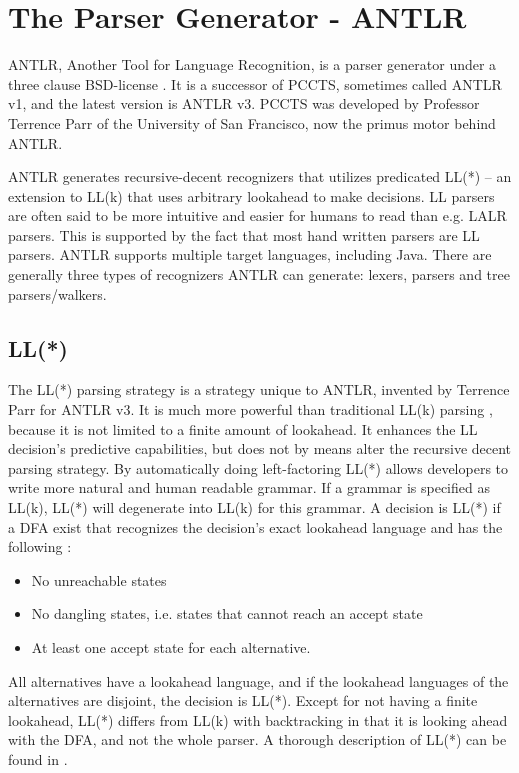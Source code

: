 \chapter{The Parser Generator - ANTLR}
\label{sect:antlr}
ANTLR, Another Tool for Language Recognition, is a parser generator under a
three clause BSD-license \cite{antlrorg}.  It is a successor of PCCTS,
sometimes called ANTLR v1, and the latest version is ANTLR v3. PCCTS was
developed by Professor Terrence Parr of the University of San Francisco, now
the primus motor behind ANTLR.

ANTLR generates recursive-decent recognizers that utilizes predicated LL(*) --
an extension to LL(k) that uses arbitrary lookahead to make decisions. LL
parsers are often said to be more intuitive and easier for humans to read than
e.g. LALR parsers. This is supported by the fact that most hand written parsers
are LL parsers. ANTLR supports multiple target languages, including Java. There
are generally three types of recognizers ANTLR can generate: lexers, parsers
and tree parsers/walkers.      

\section{LL(*)}
The LL(*) parsing strategy is a strategy unique to ANTLR, invented by Terrence Parr for ANTLR v3. It is much more powerful than traditional LL(k) parsing \cite{definitiveAntlr}, because it is not limited to a finite amount of lookahead. It enhances the LL decision's predictive capabilities, but does not by means alter the recursive decent parsing strategy.  By automatically doing left-factoring LL(*) allows developers to write more natural and human readable grammar. If a grammar is specified as LL(k), LL(*) will degenerate into LL(k) for this grammar. A decision is LL(*) if a DFA exist that recognizes the decision's exact lookahead language and has the following \cite{definitiveAntlr}:
\begin{itemize}
\item No unreachable states
\item No dangling states, i.e. states that cannot reach an accept state
\item At least one accept state for each alternative.
\end{itemize}
All alternatives have a lookahead language, and if the lookahead languages of the alternatives are disjoint, the decision is LL(*). Except for not having a finite lookahead, LL(*) differs from LL(k) with backtracking in that it is looking ahead with the DFA, and not the whole parser. A thorough description of LL(*) can be found in \cite{lookahead}.

